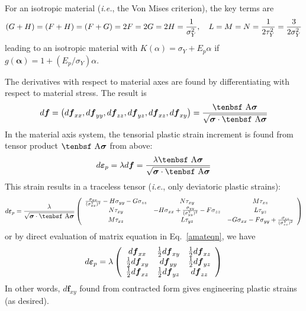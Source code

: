 \documentclass[11pt]{book}
\renewcommand{\vec}[1]{\boldsymbol{#1}}
\def\A{\hbox{\tenbsf A}}
\def\dpl{d \vec{\varepsilon}_{p}}
\def\df{d \vec{f}}
\def\s#1{\sigma_{#1}}
\def\t#1{\tau_{#1}}
\begin{document}
For an isotropic material ({\em i.e.}, the Von Mises criterion), the key terms are
\begin{equation}
   (G+H) = (F+H) = (F+G) = 2F = 2G = 2H = {1\over \sigma_Y^2}, \quad L=M=N = {1\over 2\tau_Y^2} = {3\over 2\sigma_Y^2}
\end{equation}
leading to an isotropic material with $K(\alpha)=\sigma_Y + E_p\alpha$ if $g(\vec\alpha) = 1 + (E_p/\sigma_Y)\alpha$.

The derivatives with respect to material axes are found by differentiating with respect to material stress. The result is
\begin{equation}
         \df = \left(\df_{xx},\df_{yy},\df_{zz},\df_{yz},\df_{xz},\df_{xy}\right)
        = {\A {\vec\sigma}\over\sqrt{{\vec\sigma} \cdot \A {\vec\sigma}}}      \label{amateqn}
 \end{equation}
In the material axis system, the tensorial plastic strain increment is found from tensor product $\A\vec\sigma$ from above:
\begin{equation}
       {\dpl} = \lambda \df = {\lambda\A {\vec\sigma}\over\sqrt{{\vec\sigma} \cdot \A {\vec\sigma}}}
\end{equation}
This strain results in a traceless tensor ({\em i.e.}, only deviatoric plastic strains):
\begin{equation}
         \dpl = {\lambda\over \sqrt{{\vec\sigma} \cdot \A {\vec\sigma}}}
         \left( \begin{array}{ccc}
                      {{\s{xx}}\over (\s{xx}^Y)^2} - H{\s{yy}} - G{\s{zz}} & N{\t{xy}} & M{\t{xz}} \\
                       N{\t{xy}} & -H{\s{xx}} + {{\s{yy}}\over (\s{yy}^Y)^2} - F{\s{zz}} & L{\t{yz}}  \\
                       M{\t{xz}} & L{\t{yz}} & -G{\s{xx}} -F{\s{yy}} +{{\s{zz}}\over (\s{zz}^Y)^2} 
                        \end{array} \right)
\end{equation}
or by direct evaluation of matrix equation in Eq.~\ref{amateqn}, we have
\begin{equation}
         \dpl = \lambda
         \left( \begin{array}{ccc}
                      \df_{xx} & {1\over2}\df_{xy} & {1\over2}\df_{xz} \\
                       {1\over2}\df_{xy} & \df_{yy} & {1\over2}\df_{yz}  \\
                      {1\over2} \df_{xz} &{1\over2} \df_{yz} & \df_{zz} 
                        \end{array} \right)
\end{equation}
In other words, $\df_{xy}$ found from contracted form gives engineering plastic strains (as desired).
\end{document}

